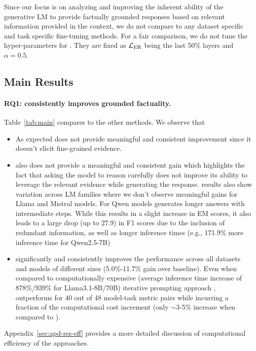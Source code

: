 Since our focus is on analyzing and improving the inherent ability of the generative LM to provide factually grounded responses based on relevant information provided in the context, we do not compare to any dataset specific and task specific fine-tuning methods. For a fair comparison, we do not tune the hyper-parameters for \se. They are fixed as ${\mathcal{L}}_\text{ER}$ being the last 50\% layers and $\alpha=0.5$.

\subsection{Main Results}\label{sec:exp-main}
\vspace{-0.5em}

\paragraph{RQ1: \se consistently improves grounded factuality.}
Table~\ref{tab:main} compares \se to the other methods. We observe that
\begin{itemize}
    \item As expected \fe does not provide meaningful and consistent improvement since it doesn't elicit fine-grained evidence. 
    \item \co also does not provide a meaningful and consistent gain which highlights the fact that asking the model to reason carefully does not improve its ability to leverage the relevant evidence while generating the response. \co results also show variation across LM families where we don't observe meaningful gains for Llama and Mistral models. For Qwen models \co generates longer answers with intermediate steps. 
    While this results in a slight increase in EM scores, it also leads to a large drop (up to 27.9) in F1 scores due to the inclusion of redundant information, as well as longer inference times (e.g., 171.9\% more inference time for Qwen2.5-7B)
    \item \se significantly and consistently improves the performance across all datasets and models of different sizes (5.0\%-11.7\% gain over baseline). Even when compared to computationally expensive (average inference time increase of 878\%/939\% for Llama3.1-8B/70B) iterative prompting approach \pe, \se outperforms for 40 out of 48 model-task metric pairs while incurring a fraction of the computational cost increment (only $\sim$3-5\% increase when compared to \pe).  
    

\end{itemize}
Appendix~\ref{sec:apd-res-eff} provides a more detailed discussion of computational efficiency of the approaches.


